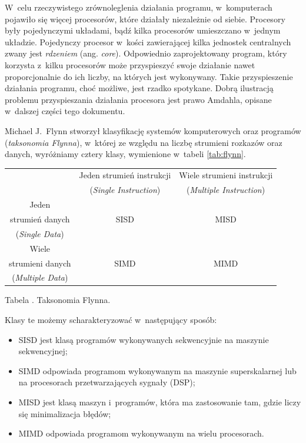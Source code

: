 \documentclass[12pt,makeidx]{mwart}
\newcounter{tabmain}
\newcommand{\mytabcaption}[1]{ \begin{center}Tabela \arabic{tabmain}. #1.\end{center} \addtocounter{tabmain}{1} }
\begin{document}
%
\indent
	W~celu rzeczywistego zrównoleglenia działania programu, w~komputerach pojawiło się więcej procesorów,
	które działały niezależnie od siebie. Procesory były pojedynczymi układami, bądź kilka procesorów umieszczano w~jednym układzie. 
	Pojedynczy procesor w~kości zawierającej kilka jednostek centralnych zwany jest \emph{rdzeniem} (ang. \emph{core}).
	Odpowiednio zaprojektowany program,	który korzysta z~kilku procesorów może przyspieszyć swoje działanie nawet proporcjonalnie do ich liczby,
	na których jest wykonywany.	Takie przyspieszenie działania programu, choć możliwe, jest rzadko spotykane.
	Dobrą ilustracją problemu przyspieszania działania procesora jest prawo Amdahla, opisane w~dalszej części tego dokumentu.
\par
%
\indent
	Michael J.~Flynn stworzył klasyfikację systemów komputerowych oraz programów (\emph{taksonomia Flynna}), w~której ze względu na liczbę
	strumieni rozkazów oraz danych, wyróżniamy cztery klasy, wymienione w~tabeli \ref{tab:flynn}.
	\begin{center}
	\centering
	\begin{tabular}{|c|c|c|} \hline
													 & Jeden strumień instrukcji	 & Wiele strumieni instrukcji \\
													 & (\emph{Single Instruction}) & (\emph{Multiple Instruction}) \\\hline
			Jeden                &     												 &      \\
			strumień danych      &  SISD										   & MISD 			\\
			(\emph{Single Data}) &                             & \\\hline
			Wiele                &     												 &      \\
			strumieni danych     & SIMD                        & MIMD \\
			(\emph{Multiple Data}) & 										 & 			\\\hline
	\end{tabular}
	\mytabcaption{Taksonomia Flynna}
	\label{tab:flynn}
	\end{center}
	Klasy te możemy scharakteryzować w~następujący sposób:
	\begin{itemize}
		\item SISD jest klasą programów wykonywanych sekwencyjnie na maszynie sekwencyjnej;
		\item SIMD odpowiada programom wykonywanym na maszynie superskalarnej lub na procesorach przetwarzających sygnały (DSP);
		\item MISD jest klasą maszyn i~programów, która ma zastosowanie tam, gdzie liczy się minimalizacja błędów;
		\item MIMD odpowiada programom wykonywanym na wielu procesorach.
	\end{itemize}
\end{document}
